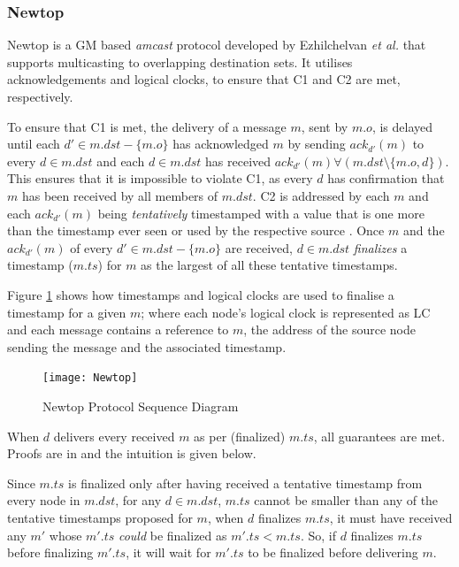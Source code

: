         \subsubsection*{Newtop} \label{ssec:newtop}
        Newtop\citep{Ezhilchelvan:1995:NFG:876885.880005} is a GM based \emph{amcast} protocol developed by Ezhilchelvan \emph{et al.} that supports multicasting to overlapping destination sets.  It utilises acknowledgements and logical clocks, to ensure that C1 and C2 are met, respectively.  
        
        To ensure that C1 is met, the delivery of a message $m$, sent by $m.o$, is delayed until each $d' \in m.dst-\{m.o\}$ has acknowledged $m$ by sending $ack_{d'}(m)$ to every $d \in m.dst$ and each $d \in m.dst$ has received $ack_{d'}(m) \forall (m.dst \setminus \{m.o,d\})$.  This ensures that it is impossible to violate C1, as every $d$ has confirmation that $m$ has been received by all members of $m.dst$.
        C2 is addressed by each $m$ and each $ack_{d'}(m)$ being \emph{tentatively} timestamped with a value that is one more than the timestamp ever seen or used by the respective source \cite{Lamport:1978:TCO:359545.359563}. Once $m$ and the $ack_{d'}(m)$ of every $d'\in m.dst-\{m.o\}$ are received, $d \in m.dst$ \emph{finalizes} a timestamp ($m.ts$) for $m$ as the largest of all these tentative timestamps. 
        
        Figure \ref{fig:newtop} shows how timestamps and logical clocks are used to finalise a timestamp for a given $m$; where each node's logical clock is represented as LC and each message contains a reference to $m$, the address of the source node sending the message and the associated timestamp.  

    \begin{figure}[htbp!] 
                \centering    
                \texttt{[image: Newtop]}
                \caption[Newtop Atomic Multicast Protocol]{Newtop Protocol Sequence Diagram}
                \label{fig:newtop}
            \end{figure}	          
        
        When $d$ delivers every received $m$ as per (finalized) $m.ts$, all guarantees are met. Proofs are in \cite{Lamport:1978:TCO:359545.359563, Birman:1991:LCA:128738.128742, Ezhilchelvan:1995:NFG:876885.880005} and the intuition is given below.
        
        Since $m.ts$ is finalized only after having received a tentative timestamp from every node in $m.dst$, for any $d \in m.dst$, $m.ts$ cannot be smaller than any of the tentative timestamps proposed for $m$, when $d$ finalizes $m.ts$, it must have received any $m'$ whose $m'.ts$ \emph{could} be finalized as $m'.ts < m.ts$. So, if $d$ finalizes $m.ts$ before finalizing $m'.ts$, it will wait for $m'.ts$ to be finalized before delivering $m$.
        
